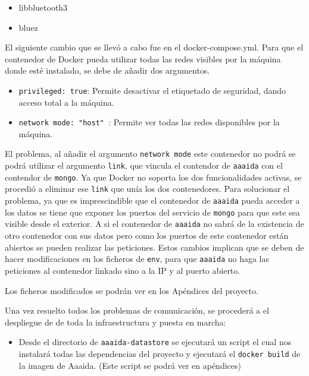 \begin{itemize}
\item libbluetooth3
\item bluez
\end{itemize}

El siguiente cambio que se llevó a cabo fue en el docker-compose.yml. Para que el contenedor de Docker pueda utilizar todas las redes visibles por la máquina donde esté instalado, se debe de añadir dos argumentos.

\begin{itemize}
\item \texttt{privileged: true}: Permite desactivar el etiquetado de seguridad, dando acceso total a la máquina. 
\item \texttt{network mode: "host" }: Permite ver todas las redes disponibles por la máquina. 
\end{itemize}

El problema, al añadir el argumento \texttt{network mode} este contenedor no podrá se podrá utilizar el argumento \texttt{link}, que vincula el contendor de \texttt{aaaida} con el contendor de \texttt{mongo}.  Ya que Docker no soporta los dos funcionalidades activas, se procedió a eliminar ese \texttt{link} que unía los dos contenedores. Para solucionar el problema, ya que es imprescindible que el contenedor de \texttt{aaaida} pueda acceder a los datos se tiene que exponer los puertos del servicio de \texttt{mongo} para que este sea visible desde el exterior. A si el contenedor de \texttt{aaaida} no sabrá de la existencia de otro contenedor con sus datos pero como los puertos de este contenedor están abiertos se pueden realizar las peticiones. Estos cambios implican que se deben de hacer modificaciones en los ficheros de \texttt{env}, para que \texttt{aaaida} no haga las peticiones al contenedor linkado sino a la IP y al puerto abierto.

Los ficheros modificados se podrán ver en los Apéndices del proyecto. 

Una vez resuelto todos los problemas de comunicación, se procederá a el despliegue de de toda la infraestructura y puesta en marcha:

\begin{itemize}
\item Desde el directorio de \texttt{aaaida-datastore} se ejecutará un script el cual nos instalará todas las dependencias del proyecto y ejecutará el  \texttt{docker build} de la imagen de Aaaida. (Este script se podrá ver en apéndices) 
\end{itemize}

